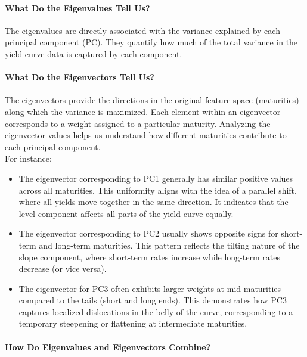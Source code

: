 \documentclass[12pt]{article}
\begin{document}
\paragraph{What Do the Eigenvalues Tell Us?}

The eigenvalues are directly associated with the variance explained by each principal component (PC). They quantify how much of the total variance in the yield curve data is captured by each component.

\paragraph{What Do the Eigenvectors Tell Us?}

The eigenvectors provide the directions in the original feature space (maturities) along which the variance is maximized. Each element within an eigenvector corresponds to a weight assigned to a particular maturity. Analyzing the eigenvector values helps us understand how different maturities contribute to each principal component.\\

For instance:
\begin{itemize}
    \item The eigenvector corresponding to PC1 generally has similar positive values across all maturities. This uniformity aligns with the idea of a parallel shift, where all yields move together in the same direction. It indicates that the level component affects all parts of the yield curve equally.
    \item The eigenvector corresponding to PC2 usually shows opposite signs for short-term and long-term maturities. This pattern reflects the tilting nature of the slope component, where short-term rates increase while long-term rates decrease (or vice versa).
    \item The eigenvector for PC3 often exhibits larger weights at mid-maturities compared to the tails (short and long ends). This demonstrates how PC3 captures localized dislocations in the belly of the curve, corresponding to a temporary steepening or flattening at intermediate maturities.
\end{itemize}

\paragraph{How Do Eigenvalues and Eigenvectors Combine?}
\end{document}
